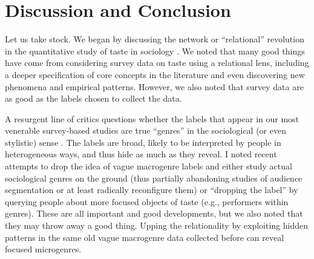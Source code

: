 \documentclass[a4paper,12pt]{extarticle}
\begin{document}
\section{Discussion and Conclusion}
Let us take stock. We began by discussing the network or ``relational'' revolution in the quantitative study of taste in sociology \citep{pachucki2010cultural, vlegels2017music, lizardo14}. We noted that many good things have come from considering survey data on taste using a relational lens, including a deeper specification of core concepts in the literature and even discovering new phenomena and empirical patterns. However, we also noted that survey data are as good as the labels chosen to collect the data. 

A resurgent line of critics questions whether the labels that appear in our most venerable survey-based studies are true ``genres'' in the sociological (or even stylistic) sense \citep{lena2015relational, vlegels2015music}. The labels are broad, likely to be interpreted by people in heterogeneous ways, and thus hide as much as they reveal. I noted recent attempts to drop the idea of vague macrogenre labels and either study actual sociological genres on the ground (thus partially abandoning studies of audience segmentation or at least radically reconfigure them) or ``dropping the label'' \citep{sonnett2016ambivalence} by querying people about more focused objects of taste (e.g., performers within genres). These are all important and good developments, but we also noted that they may throw away a good thing. Upping the relationality by exploiting hidden patterns in the same old vague macrogenre data collected before can reveal focused microgenres. 
\end{document}
